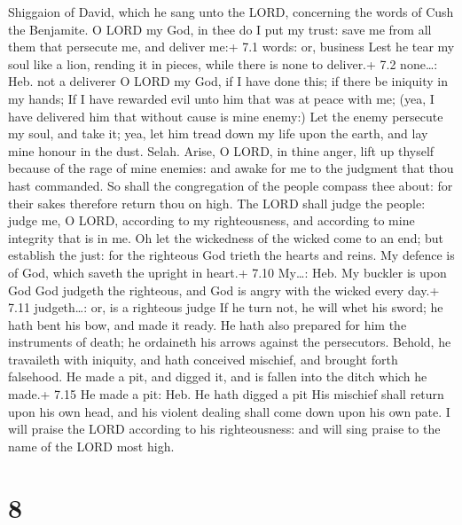Shiggaion of David, which he sang unto the LORD, concerning the words of
Cush the Benjamite.  O LORD my God, in thee do I put my
trust: save me from all them that persecute me, and deliver me:+ 7.1
words: or, business  Lest he tear my soul like a lion,
rending it in pieces, while there is none to deliver.+ 7.2 none\ldots:
Heb. not a deliverer  O LORD my God, if I have done this; if
there be iniquity in my hands;  If I have rewarded evil unto
him that was at peace with me; (yea, I have delivered him that without
cause is mine enemy:)  Let the enemy persecute my soul, and
take it; yea, let him tread down my life upon the earth, and lay mine
honour in the dust. Selah.  Arise, O LORD, in thine anger,
lift up thyself because of the rage of mine enemies: and awake for me to
the judgment that thou hast commanded.  So shall the
congregation of the people compass thee about: for their sakes therefore
return thou on high.  The LORD shall judge the people: judge
me, O LORD, according to my righteousness, and according to mine
integrity that is in me.  Oh let the wickedness of the
wicked come to an end; but establish the just: for the righteous God
trieth the hearts and reins.  My defence is of God, which
saveth the upright in heart.+ 7.10 My\ldots: Heb. My buckler is upon God
 God judgeth the righteous, and God is angry with the
wicked every day.+ 7.11 judgeth\ldots: or, is a righteous judge
 If he turn not, he will whet his sword; he hath bent his
bow, and made it ready.  He hath also prepared for him the
instruments of death; he ordaineth his arrows against the persecutors.
 Behold, he travaileth with iniquity, and hath conceived
mischief, and brought forth falsehood.  He made a pit, and
digged it, and is fallen into the ditch which he made.+ 7.15 He made a
pit: Heb. He hath digged a pit  His mischief shall return
upon his own head, and his violent dealing shall come down upon his own
pate.  I will praise the LORD according to his
righteousness: and will sing praise to the name of the LORD most high.

\hypertarget{section-7}{%
\section{8}\label{section-7}}


